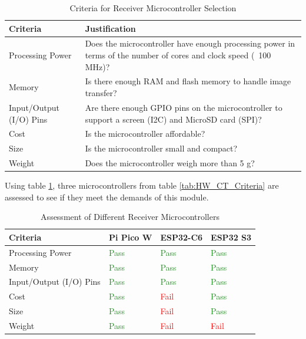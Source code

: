 \documentclass[class=report,11pt,crop=false]{standalone}
\begin{document}
\begin{table}[h]
\centering
\begin{tabular}{|l|p{10cm}|}
\hline
\textbf{Criteria} & \textbf{Justification} \\
\hline
Processing Power & Does the microcontroller have enough processing power in terms of the number of cores and clock speed (~100 MHz)? \\
\hline
Memory & Is there enough RAM and flash memory to handle image transfer? \\
\hline
Input/Output (I/O) Pins & Are there enough GPIO pins on the microcontroller to support a screen (I2C) and MicroSD card (SPI)? \\
\hline
Cost & Is the microcontroller affordable? \\
\hline
Size & Is the microcontroller small and compact? \\
\hline
Weight & Does the microcontroller weigh more than 5 g? \\
\hline
\end{tabular}
\caption{Criteria for Receiver Microcontroller Selection}
\label{tab:HW_R_Criteria}
\end{table}

Using table \ref{tab:HW_R_Criteria}, three microcontrollers from table \ref{tab:HW_CT_Criteria} are assessed to see if they meet the demands of this module.

\begin{table}[h]
\centering
\begin{tabular}{|l|l|l|l|}
\hline
\textbf{Criteria} & \textbf{Pi Pico W} & \textbf{ESP32-C6} & \textbf{ESP32 S3} \\
\hline
Processing Power & \textcolor{ForestGreen}{Pass} & \textcolor{ForestGreen}{Pass} & \textcolor{ForestGreen}{Pass} \\
\hline
Memory & \textcolor{ForestGreen}{Pass} & \textcolor{ForestGreen}{Pass} & \textcolor{ForestGreen}{Pass} \\
\hline
Input/Output (I/O) Pins & \textcolor{ForestGreen}{Pass} & \textcolor{ForestGreen}{Pass} & \textcolor{ForestGreen}{Pass} \\
\hline
Cost & \textcolor{ForestGreen}{Pass} & \textcolor{red}{Fail} & \textcolor{ForestGreen}{Pass} \\
\hline
Size & \textcolor{ForestGreen}{Pass} & \textcolor{red}{Fail} & \textcolor{ForestGreen}{Pass} \\
\hline
Weight & \textcolor{ForestGreen}{Pass} & \textcolor{red}{Fail} & \textcolor{red}{Fail} \\
\hline
\end{tabular}
\caption{Assessment of Different Receiver Microcontrollers}
\label{tab:HW_R_Result}
\end{table}
\end{document}
